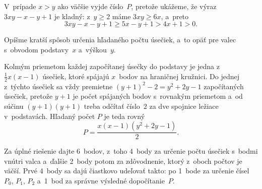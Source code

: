 {V~prípade $x>y$ ako väčšie vyjde číslo~$P$, pretože ukážeme, že výraz
$3xy-x-y+1$ je kladný:
z~$y\ge2$ máme $3xy\ge6x$, a~preto
$$
3xy-x-y+1\ge5x-y+1>4x+1>0.
$$

\poznamka
Opíšme kratší spôsob určenia hľadaného počtu úsečiek, a~to opäť
pre valec s~obvodom podstavy~$x$ a~výškou~$y$.

Kolmým priemetom každej započítanej úsečky do podstavy je jedna
z~$\frac12x(x-1)$ úsečiek, ktoré spájajú $x$~bodov na hraničnej
kružnici. Do jednej z~týchto úsečiek sa vždy premietne
$(y+1)^2-2=y^2+2y-1$ započítaných úsečiek, pretože $y+1$ je počet
spájaných bodov s~rovnakým priemetom a~od súčinu $(y+1)(y+1)$ treba odčítať
číslo~$2$ za dve spojnice ležiace v~podstavách.
Hľadaný počet $P$ je teda rovný
$$
P=\frac{x(x-1)(y^2+2y-1)}{2}.
$$

\nobreak\medskip\petit\noindent
Za úplné riešenie dajte 6~bodov, z~toho 4~body za určenie
počtu úsečiek s~bodmi vnútri valca a~ďalšie 2~body potom za zdôvodnenie,
ktorý z~oboch počtov je väčší. Prvé 4~body sa dajú čiastkovo udeľovať
takto: po 1~bode za určenie čísel $P_0$, $P_1$, $P_2$ a~1~bod
za správne výsledné dopočítanie~$P$.

\endpetit
\bigbreak
}

